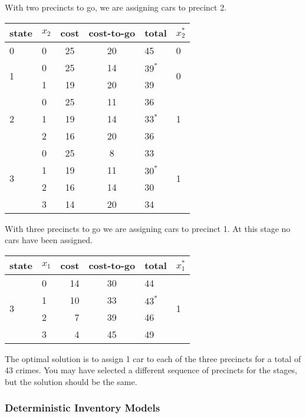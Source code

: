 \begin{enumerate}
\begin{solution}
  With two precincts to go, we are assigning cars to precinct 2.

  \begin{tabular}{llccll}
    state & $x_2$ & cost & cost-to-go & total & $x_2^{\ast}$ \\ \hline
    0 & 0 & 25 & 20 & 45 & 0 \\ \hline

    \multirow{2}{*}{1} & 0 & 25 & 14 & $39^{\ast}$ & \multirow{2}{*}{0} \\
          & 1 & 19 & 20 & 39 &  \\ \hline

    \multirow{3}{*}{2} & 0 & 25 & 11 & 36 & \multirow{3}{*}{1} \\
          & 1 & 19 & 14 & 33$^{\ast}$ &  \\
          & 2 & 16 & 20 & 36 & \\ \hline

    \multirow{4}{*}{3} & 0 & 25 & 8 & 33 & \multirow{4}{*}{1}\\
    & 1 & 19 & 11 & $30^{\ast}$ &  \\
    & 2 & 16 & 14 & 30 & \\
    & 3 & 14 & 20 & 34 & 
  \end{tabular}

  With three precincts to go we are assigning cars to precinct 1. At this
  stage no cars have been assigned.

  \begin{tabular}{llrcll}
    state & $x_1$ & cost & cost-to-go & total & $x_1^{\ast}$ \\ \hline
    \multirow{4}{*}{3} & 0 & 14 & 30 & 44 & \multirow{4}{*}{1} \\
          & 1 & 10 & 33 & $43^{\ast}$ & \\
          & 2 & 7 & 39 & 46 & \\
          & 3 & 4 & 45 & 49 &
  \end{tabular}

  The optimal solution is to assign 1 car to each of the three
  precincts for a total of 43 crimes. You may have selected a
  different sequence of precincts for the stages, but the solution
  should be the same.
\end{solution}

\subsubsection*{Deterministic Inventory Models}


\end{enumerate}
